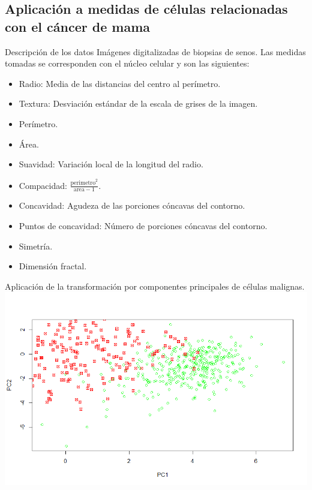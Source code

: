 \documentclass{beamer}
\begin{document}
\subsection{Aplicación a medidas de células relacionadas con el cáncer de mama}
\begin{frame}{Descripción de los datos}
Imágenes digitalizadas de biopsias de senos. Las medidas tomadas se corresponden con el núcleo celular y son las siguientes:
\begin{minipage}[t]{0.48\linewidth}
   \begin{itemize}
        \item Radio: Media de las distancias del centro al perímetro.
        \item Textura: Desviación estándar de la escala de grises de la imagen.
        \item Perímetro.
        \item Área.
        \item Suavidad: Variación local de la longitud del radio.
    \end{itemize}
\end{minipage}
\begin{minipage}[t]{0.48\linewidth}
    \begin{itemize}
    \item Compacidad: $\frac{\mathrm{perimetro}^2}{\mathrm{area}-1}.$
    \item Concavidad: Agudeza de las porciones cóncavas del contorno.
    \item Puntos de concavidad: Número de porciones cóncavas del contorno.
    \item Simetría.
    \item Dimensión fractal.
    \end{itemize}
\end{minipage}
\end{frame}

\begin{frame}{Aplicación de la transformación por componentes principales de células malignas.}
\centering
\includegraphics[scale=0.4]{img/breast_m}
\end{frame}
\end{document}
